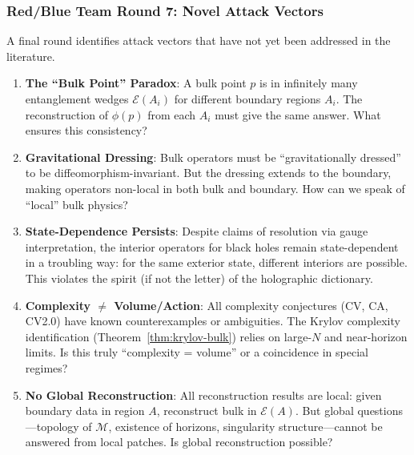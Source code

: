 \documentclass[12pt,a4paper]{article}
\begin{document}
\subsubsection{Red/Blue Team Round 7: Novel Attack Vectors}
\label{subsubsec:red-blue-round7}

A final round identifies attack vectors that have not yet been addressed in the literature.

\begin{tcolorbox}[colback=red!5!white, colframe=red!75!black, title=\textbf{RED TEAM Round 7: Novel Attacks}]

\begin{enumerate}[label=\textbf{R7.\arabic*.}]
    \item \textbf{The ``Bulk Point'' Paradox}: A bulk point $p$ is in infinitely many entanglement wedges $\mathcal{E}(A_i)$ for different boundary regions $A_i$. The reconstruction of $\phi(p)$ from each $A_i$ must give the same answer. What ensures this consistency?
    
    \item \textbf{Gravitational Dressing}: Bulk operators must be ``gravitationally dressed'' to be diffeomorphism-invariant. But the dressing extends to the boundary, making operators non-local in both bulk and boundary. How can we speak of ``local'' bulk physics?
    
    \item \textbf{State-Dependence Persists}: Despite claims of resolution via gauge interpretation, the interior operators for black holes remain state-dependent in a troubling way: for the same exterior state, different interiors are possible. This violates the spirit (if not the letter) of the holographic dictionary.
    
    \item \textbf{Complexity $\neq$ Volume/Action}: All complexity conjectures (CV, CA, CV2.0) have known counterexamples or ambiguities. The Krylov complexity identification (Theorem~\ref{thm:krylov-bulk}) relies on large-$N$ and near-horizon limits. Is this truly ``complexity = volume'' or a coincidence in special regimes?
    
    \item \textbf{No Global Reconstruction}: All reconstruction results are local: given boundary data in region $A$, reconstruct bulk in $\mathcal{E}(A)$. But global questions---topology of $\mathcal{M}$, existence of horizons, singularity structure---cannot be answered from local patches. Is global reconstruction possible?
\end{enumerate}

\end{tcolorbox}
\end{document}
